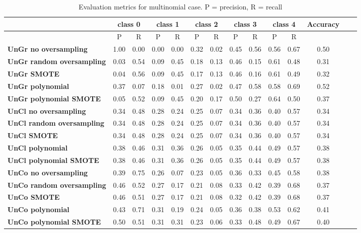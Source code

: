 \documentclass{article}
\begin{document}
\begin{table}[h!]
  \centering
  \begin{tabular}{|p{3cm}|c|c|c|c|c|c|c|c|c|c|c|c|c|}
    \hline
     & \multicolumn{2}{|c|}{\textbf{class 0}} & \multicolumn{2}{|c|}{\textbf{class 1}} & \multicolumn{2}{|c|}{\textbf{class 2}} & \multicolumn{2}{|c|}{\textbf{class 3}} & \multicolumn{2}{|c|}{\textbf{class 4}} & \textbf{Accuracy} \\
    \hline
    & P & R & P & R & P & R & P & R & P & R &  \\
    \hline
    \textbf{UnGr no oversampling} & 1.00 & 0.00 & 0.00 & 0.00 & 0.32 & 0.02 & 0.45 & 0.56 & 0.56 & 0.67 & 0.50 \\
    \hline
    \textbf{UnGr random oversampling} & 0.03 & 0.54 & 0.09 & 0.45 & 0.18 & 0.13 & 0.46 & 0.15 & 0.61 & 0.48 & 0.31 \\
    \hline
    \textbf{UnGr SMOTE} & 0.04 & 0.56 & 0.09 & 0.45 & 0.17 & 0.13 & 0.46 & 0.16 & 0.61 & 0.49 & 0.32 \\
    \hline
    \textbf{UnGr polynomial} & 0.37 & 0.07 & 0.18 & 0.01 & 0.27 & 0.02 & 0.47 & 0.58 & 0.58 & 0.69 & 0.52 \\
    \hline
    \textbf{UnGr polynomial SMOTE} & 0.05 & 0.52 & 0.09 & 0.45 & 0.20 & 0.17 & 0.50 & 0.27 & 0.64 & 0.50 & 0.37 \\
    \hline
    \textbf{UnCl no oversampling} & 0.34 & 0.48 & 0.28 & 0.24 & 0.25 & 0.07 & 0.34 & 0.36 & 0.40 & 0.57 & 0.34 \\
    \hline
    \textbf{UnCl random oversampling} & 0.34 & 0.48 & 0.28 & 0.24 & 0.25 & 0.07 & 0.34 & 0.36 & 0.40 & 0.57 & 0.34 \\
    \hline
    \textbf{UnCl SMOTE} & 0.34 & 0.48 & 0.28 & 0.24 & 0.25 & 0.07 & 0.34 & 0.36 & 0.40 & 0.57 & 0.34 \\
    \hline
    \textbf{UnCl polynomial} & 0.38 & 0.46 & 0.31 & 0.36 & 0.26 & 0.05 & 0.35 & 0.44 & 0.49 & 0.57 & 0.38 \\
    \hline
    \textbf{UnCl polynomial SMOTE} & 0.38 & 0.46 & 0.31 & 0.36 & 0.26 & 0.05 & 0.35 & 0.44 & 0.49 & 0.57 & 0.38 \\
    \hline
    \textbf{UnCo no oversampling} & 0.39 & 0.75 & 0.26 & 0.07 & 0.23 & 0.05 & 0.36 & 0.33 & 0.45 & 0.58 & 0.38 \\
    \hline
    \textbf{UnCo random oversampling} & 0.46 & 0.52 & 0.27 & 0.17 & 0.21 & 0.08 & 0.33 & 0.42 & 0.39 & 0.68 & 0.37 \\
    \hline
    \textbf{UnCo SMOTE} & 0.46 & 0.51 & 0.27 & 0.17 & 0.21 & 0.08 & 0.32 & 0.42 & 0.39 & 0.68 & 0.37 \\
    \hline
    \textbf{UnCo polynomial} & 0.43 & 0.71 & 0.31 & 0.19 & 0.24 & 0.05 & 0.36 & 0.38 & 0.53 & 0.62 & 0.41 \\
    \hline
    \textbf{UnCo polynomial SMOTE} & 0.50 & 0.51 & 0.31 & 0.31 & 0.23 & 0.06 & 0.33 & 0.48 & 0.49 & 0.67 & 0.40 \\
    \hline
  \end{tabular}
  \caption{Evaluation metrics for multinomial case. P = precision, R = recall}
  \label{tab:EvMetMultireg}
\end{table}
\end{document}
